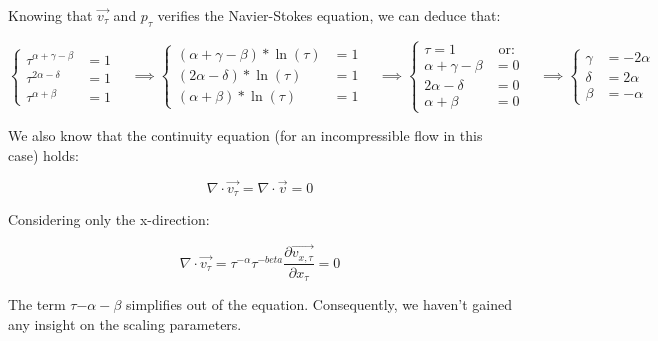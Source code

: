 Knowing that $\vec{v_{\tau}}$ and $p_{\tau}$ verifies the Navier-Stokes equation, we can deduce that:


\begin{equation*}
\begin{cases} \tau^{\alpha + \gamma - \beta} & = 1 \\ \tau^{2\alpha - \delta} & = 1 \\ \tau^{\alpha + \beta} & = 1 \end{cases} \quad
\implies \begin{cases} (\alpha + \gamma - \beta)*\ln(\tau) & = 1 \\ (2\alpha - \delta)*\ln(\tau) & = 1 \\ (\alpha + \beta)*\ln(\tau) & = 1 \end{cases} \quad
\implies \begin{cases} \tau = 1 & \text{ or:} \\ \alpha + \gamma - \beta & = 0 \\ 2\alpha - \delta & = 0 \\ \alpha + \beta & = 0 \end{cases} \quad
\implies \begin{cases} \gamma & = -2\alpha \\ \delta & = 2\alpha  \\ \beta & = - \alpha \end{cases} \quad
\end{equation*}


We also know that the continuity equation (for an incompressible flow in this case) holds:

\begin{equation}
\nabla \cdot \vec{v_{\tau}} = \nabla \cdot \vec{v} = 0
\end{equation}

Considering only the x-direction:

\begin{equation}
\nabla \cdot \vec{v_{\tau}} = \tau^{-\alpha}\tau^{-beta}\frac{\partial \vec{v_{x, \tau}}}{\partial x_{\tau}} = 0
\end{equation}

The term $\tau{-\alpha - \beta}$ simplifies out of the equation. Consequently, we haven't gained any insight on the scaling parameters.
